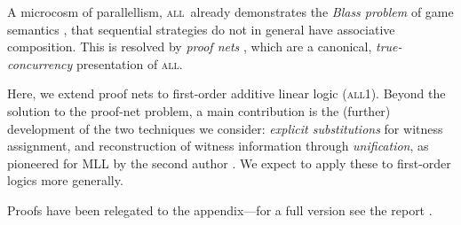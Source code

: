 \documentclass[UKenglish]{lipics-v2019}
\newcommand\all{\textsc{all}}
\newcommand\+{+}
\renewcommand\*{\times}
\begin{document}
A microcosm of parallellism, \all\ already demonstrates the \emph{Blass problem} of game semantics \cite{Abramsky-2003}, that sequential strategies do not in general have associative composition. This is resolved by \emph{proof nets} \cite{Girard-1987,Hughes-vanGlabbeek-2005}, which are a canonical, \emph{true-concurrency} presentation of \all.

Here, we extend proof nets to first-order additive linear logic (\all{\textnormal 1}). Beyond the solution to the proof-net problem, a main contribution is the (further) development of the two techniques we consider: \emph{explicit substitutions} for witness assignment, and reconstruction of witness information through \emph{unification}, as pioneered for MLL by the second author \cite{Hughes-2018}. We expect to apply these to first-order logics more generally.

Proofs have been relegated to the appendix---for a full version see the report \cite{Heijltjes-Hughes-Strassburger-2018}.
\end{document}
